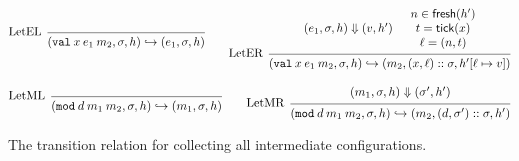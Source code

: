 \documentclass{article}
\theoremstyle{definition}
\newcommand*{\cons}{::}
\newcommand*{\modid}{d}
\newcommand*{\ctx}{\sigma}
\newcommand*{\mem}{h}
\newcommand*{\semarrow}{\hookrightarrow}
\newcommand*{\tick}{\mathsf{tick}}
\newcommand*{\fresh}{\mathsf{fresh}}
\newcommand*{\Lete}{\mathtt{val}}
\newcommand*{\Letm}{\mathtt{mod}}
\begin{document}
\begin{figure}[h!]
  \[
    \begin{prooftree}
      \infer[left label=LetEL]0{
      (\Lete\:x\:e_1\:m_2, \ctx, \mem)
      \semarrow
      (e_{1}, \ctx, \mem)
      }
    \end{prooftree}\qquad
    \begin{prooftree}
      \hypo{
        \begin{matrix}
          (e_{1}, \ctx, \mem)
          \Downarrow
          (v, \mem')
        \end{matrix}
      }
      \hypo{
        \begin{matrix}
          n\in\fresh(\mem') \\
          t=\tick(x)        \\
          \ell=(n,t)
        \end{matrix}
      }
      \infer[left label=LetER]2{
      (\Lete\:x\:e_1\:m_2, \ctx, \mem)
      \semarrow
      (m_{2}, (x, \ell)\cons \ctx, \mem'[\ell\mapsto v])
      }
    \end{prooftree}
  \]

  \[
    \begin{prooftree}
      \infer[left label=LetML]0{
      (\Letm\:\modid\:m_{1}\:m_{2}, \ctx, \mem)
      \semarrow
      (m_{1}, \ctx, \mem)
      }
    \end{prooftree}\qquad
    \begin{prooftree}
      \hypo{
        \begin{matrix}
          (m_{1}, \ctx, \mem)
          \Downarrow
          (\ctx', \mem')
        \end{matrix}
      }
      \infer[left label=LetMR]1{
      (\Letm\:\modid\:m_{1}\:m_{2}, \ctx, \mem)
      \semarrow
      (m_{2}, (\modid, \ctx')\cons \ctx, \mem')
      }
    \end{prooftree}
  \]
  \caption{The transition relation for collecting all intermediate configurations.}
  \label{fig:simpreach}
\end{figure}
\end{document}

